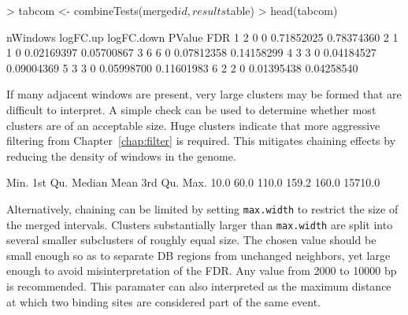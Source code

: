 \documentclass[12pt]{report}
\renewenvironment{Schunk}{\vspace{0pt}}{\vspace{0pt}}
\newcommand{\code}[1]{{\small\texttt{#1}}}
\begin{document}
\begin{Schunk}
\begin{Sinput}
> tabcom <- combineTests(merged$id, results$table)
> head(tabcom)
\end{Sinput}
\begin{Soutput}
  nWindows logFC.up logFC.down     PValue        FDR
1        2        0          0 0.71852025 0.78374360
2        1        1          0 0.02169397 0.05700867
3        6        6          0 0.07812358 0.14158299
4        3        3          0 0.04184527 0.09004369
5        3        3          0 0.05998700 0.11601983
6        2        2          0 0.01395438 0.04258540
\end{Soutput}
\end{Schunk}

If many adjacent windows are present, very large clusters may be formed that are difficult to interpret. 
A simple check can be used to determine whether most clusters are of an acceptable size. 
Huge clusters indicate that more aggressive filtering from Chapter~\ref{chap:filter} is required.  
This mitigates chaining effects by reducing the density of windows in the genome.


\begin{Schunk}
\begin{Soutput}
   Min. 1st Qu.  Median    Mean 3rd Qu.    Max. 
   10.0    60.0   110.0   159.2   160.0 15710.0 
\end{Soutput}
\end{Schunk}

Alternatively, chaining can be limited by setting \code{max.width} to restrict the size of the merged intervals. 
Clusters substantially larger than \code{max.width} are split into several smaller subclusters of roughly equal size.
The chosen value should be small enough so as to separate DB regions from unchanged neighbors, yet large enough to avoid misinterpretation of the FDR.
Any value from 2000 to 10000 bp is recommended. 
This paramater can also interpreted as the maximum distance at which two binding sites are considered part of the same event.
\end{document}
